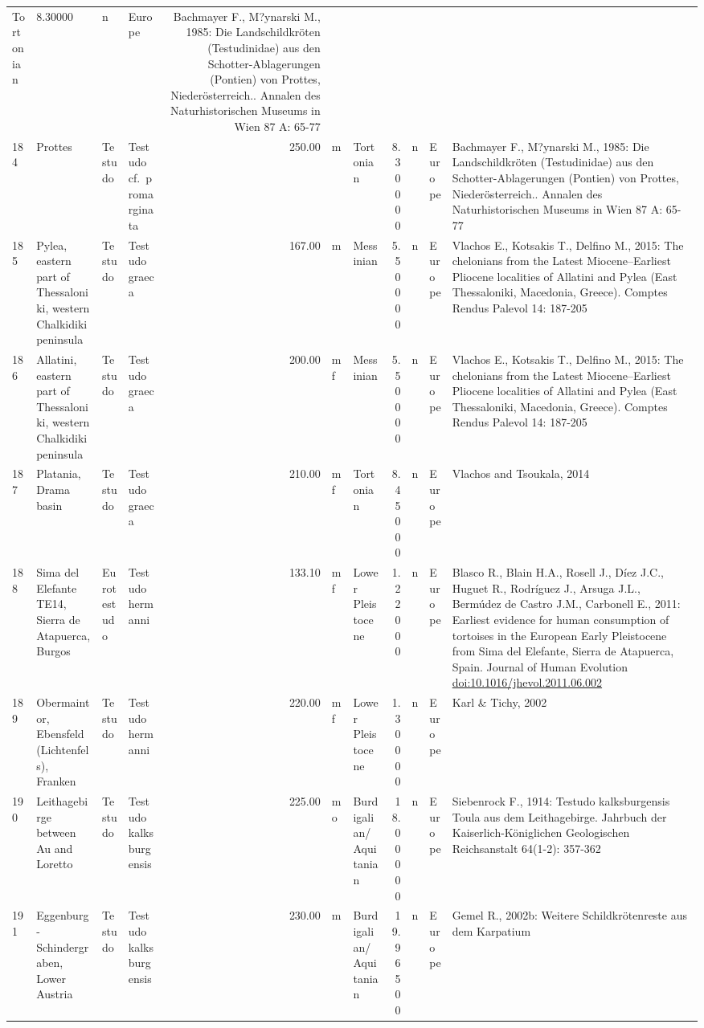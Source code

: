 \documentclass[]{article}
\begin{document}
\begin{longtable}[]{@{}llllrllrlll@{}}
Tortonian & 8.30000 & n & Europe & Bachmayer F., M?ynarski M., 1985: Die
Landschildkröten (Testudinidae) aus den Schotter-Ablagerungen (Pontien)
von Prottes, Niederösterreich.. Annalen des Naturhistorischen Museums in
Wien 87 A: 65-77\tabularnewline
184 & Prottes & Testudo & Testudo cf.~promarginata & 250.00 & m &
Tortonian & 8.30000 & n & Europe & Bachmayer F., M?ynarski M., 1985: Die
Landschildkröten (Testudinidae) aus den Schotter-Ablagerungen (Pontien)
von Prottes, Niederösterreich.. Annalen des Naturhistorischen Museums in
Wien 87 A: 65-77\tabularnewline
185 & Pylea, eastern part of Thessaloniki, western Chalkidiki peninsula
& Testudo & Testudo graeca & 167.00 & m & Messinian & 5.50000 & n &
Europe & Vlachos E., Kotsakis T., Delfino M., 2015: The chelonians from
the Latest Miocene--Earliest Pliocene localities of Allatini and Pylea
(East Thessaloniki, Macedonia, Greece). Comptes Rendus Palevol 14:
187-205\tabularnewline
186 & Allatini, eastern part of Thessaloniki, western Chalkidiki
peninsula & Testudo & Testudo graeca & 200.00 & mf & Messinian & 5.50000
& n & Europe & Vlachos E., Kotsakis T., Delfino M., 2015: The chelonians
from the Latest Miocene--Earliest Pliocene localities of Allatini and
Pylea (East Thessaloniki, Macedonia, Greece). Comptes Rendus Palevol 14:
187-205\tabularnewline
187 & Platania, Drama basin & Testudo & Testudo graeca & 210.00 & mf &
Tortonian & 8.45000 & n & Europe & Vlachos and Tsoukala,
2014\tabularnewline
188 & Sima del Elefante TE14, Sierra de Atapuerca, Burgos & Eurotestudo
& Testudo hermanni & 133.10 & mf & Lower Pleistocene & 1.22000 & n &
Europe & Blasco R., Blain H.A., Rosell J., Díez J.C., Huguet R.,
Rodríguez J., Arsuga J.L., Bermúdez de Castro J.M., Carbonell E., 2011:
Earliest evidence for human consumption of tortoises in the European
Early Pleistocene from Sima del Elefante, Sierra de Atapuerca, Spain.
Journal of Human Evolution
\url{doi:10.1016/jhevol.2011.06.002}\tabularnewline
189 & Obermaintor, Ebensfeld (Lichtenfels), Franken & Testudo & Testudo
hermanni & 220.00 & mf & Lower Pleistocene & 1.30000 & n & Europe & Karl
\& Tichy, 2002\tabularnewline
190 & Leithagebirge between Au and Loretto & Testudo & Testudo
kalksburgensis & 225.00 & mo & Burdigalian/Aquitanian & 18.00000 & n &
Europe & Siebenrock F., 1914: Testudo kalksburgensis Toula aus dem
Leithagebirge. Jahrbuch der Kaiserlich-Königlichen Geologischen
Reichsanstalt 64(1-2): 357-362\tabularnewline
191 & Eggenburg-Schindergraben, Lower Austria & Testudo & Testudo
kalksburgensis & 230.00 & m & Burdigalian/Aquitanian & 19.96500 & n &
Europe & Gemel R., 2002b: Weitere Schildkrötenreste aus dem Karpatium

\end{longtable}
\end{document}
